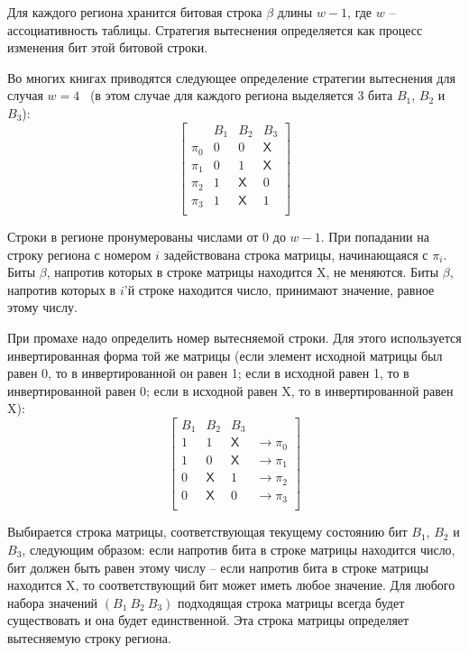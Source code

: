 Для каждого региона хранится битовая строка $\beta$ длины $w{-}1$, где $w$ --
ассоциативность таблицы. Стратегия вытеснения определяется как процесс изменения
бит этой битовой строки.

Во многих книгах приводятся следующее определение стратегии
вытеснения \PseudoLRU для случая
$w=4$~\cite{FundamentalOfComputerOrganizationAndDesign} (в этом
случае для каждого региона выделяется 3 бита $B_1$, $B_2$ и $B_3$):
$$ \left[
  \begin{array}{c|ccc}
          & B_1 & B_2 & B_3 \\ \hline
    \pi_0 & 0 & 0 & \textsf{X} \\
    \pi_1 & 0 & 1 & \textsf{X} \\
    \pi_2 & 1 & \textsf{X} & 0 \\
    \pi_3 & 1 & \textsf{X} & 1 \\
  \end{array}
\right]
$$

Строки в регионе пронумерованы числами от 0 до $w{-}1$. При попадании на строку
региона с номером $i$ задействована строка матрицы, начинающаяся с $\pi_i$. Биты
$\beta$, напротив которых в строке матрицы находится \textsf{X}, не меняются.
Биты $\beta$, напротив которых в $i$'й строке находится число, принимают
значение, равное этому числу.

При промахе надо определить номер вытесняемой строки. Для этого используется
инвертированная форма той же матрицы (если элемент исходной матрицы был равен 0, то в инвертированной он равен 1; если в исходной равен 1, то в инвертированной равен 0; если в исходной равен \textsf{X}, то в инвертированной равен \textsf{X}):
$$
\left[
  \begin{array}{ccc|c}
    B_1 & B_2 & B_3 & \\ \hline
    1 & 1 & \textsf{X} & \rightarrow \pi_0 \\
    1 & 0 & \textsf{X} & \rightarrow \pi_1 \\
    0 & \textsf{X} & 1 & \rightarrow \pi_2 \\
    0 & \textsf{X} & 0 & \rightarrow \pi_3 \\
  \end{array}
\right]
$$

Выбирается строка матрицы, соответствующая текущему состоянию бит $B_1$,
$B_2$ и $B_3$, следующим образом: если напротив бита в строке матрицы находится число, бит
должен быть равен этому числу -- если напротив бита в строке матрицы
находится \textsf{X}, то соответствующий бит может иметь любое значение. Для любого набора значений $(B_1~B_2~B_3)$ подходящая строка матрицы всегда будет существовать и она будет единственной. Эта строка матрицы определяет вытесняемую строку региона.

